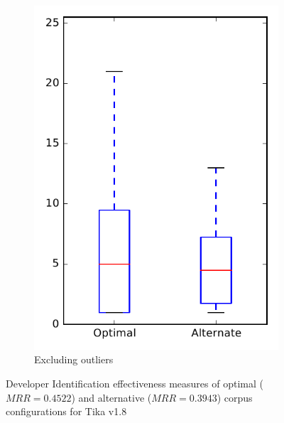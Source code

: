 \begin{figure}
\begin{subfigure}{.4\textwidth}
        \includegraphics[height=0.4\textheight]{figures/combo/dit_rq2_tika_no_outlier}
        \caption{Excluding outliers}\label{fig:combo:dit:rq2:tika_no_outlier}
    \end{subfigure}
\caption{Developer Identification effectiveness measures of optimal ($MRR=0.4522$) and alternative ($MRR=0.3943$) corpus configurations for Tika v1.8}
\label{fig:combo:dit:rq2:tika}
\end{figure}

